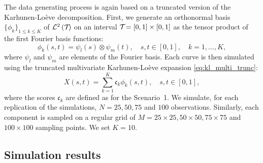 \begin{scenario}
The data generating process is again based on a truncated version of the Karhunen-Loève decomposition. First, we generate an orthonormal basis $\{\phi_k\}_{1 \leq k \leq K}$ of $\mathcal{L}^{2}\left(\mathcal{T}_{}\right)$ on an interval $\mathcal{T}_{} = [0, 1] \times [0, 1]$ as the tensor product of the first Fourier basis functions:
\begin{equation}
    \phi_k(s, t) = \psi_l(s) \otimes \psi_m(t), \quad s, t \in [0, 1],\quad k = 1, \dots, K,
\end{equation}
where $\psi_l$ and $\psi_m$ are elements of the Fourier basis.
Each curve is then simulated using the truncated multivariate Karhunen-Loève expansion \eqref{eq:kl_multi_trunc}:
\begin{equation}
    X(s, t) = \sum_{k = 1}^K \mathfrak{c}_k \phi_k(s, t), \quad s, t \in [0, 1],
\end{equation}
where the scores $\mathfrak{c}_k$ are defined as for the Scenario~1. We simulate, for each replication of the simulations, $N = 25, 50, 75$ and $100$ observations. Similarly, each component is sampled on a regular grid of $M = 25 \times 25, 50 \times 50, 75 \times 75$ and $100 \times 100$ sampling points. We set $K = 10$.
\end{scenario}


\subsection{Simulation results} %
\label{sub:simulation_results}


